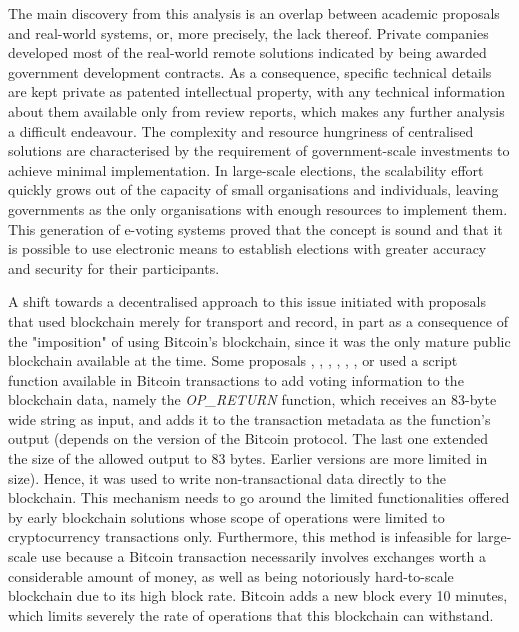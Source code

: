 \documentclass[../main.tex]{subfiles}
\begin{document}
    The main discovery from this analysis is an overlap between academic proposals and real-world systems, or, more precisely, the lack thereof. Private companies developed most of the real-world remote solutions indicated by being awarded government development contracts. As a consequence, specific technical details are kept private as patented intellectual property, with any technical information about them available only from review reports, which makes any further analysis a difficult endeavour. The complexity and resource hungriness of centralised solutions are characterised by the requirement of government-scale investments to achieve minimal implementation. In large-scale elections, the scalability effort quickly grows out of the capacity of small organisations and individuals, leaving governments as the only organisations with enough resources to implement them. This generation of e-voting systems proved that the concept is sound and that it is possible to use electronic means to establish elections with greater accuracy and security for their participants.
    \par
    A shift towards a decentralised approach to this issue initiated with proposals that used blockchain merely for transport and record, in part as a consequence of the "imposition" of using Bitcoin's blockchain, since it was the only mature public blockchain available at the time. Some proposals \cite{Zhao2016}, \cite{Cruz2016}, \cite{Bistarelli2017}, \cite{Lee2017}, \cite{Shaheen2017}, \cite{Wu2017}, \cite{Dimitriou2020} or \cite{Bartolucci2018} used a script function available in Bitcoin transactions to add voting information to the blockchain data, namely the \textit{OP\_RETURN} function, which receives an 83-byte wide string as input, and adds it to the transaction metadata as the function's output (depends on the version of the Bitcoin protocol. The last one extended the size of the allowed output to 83 bytes. Earlier versions are more limited in size). Hence, it was used to write non-transactional data directly to the blockchain. This mechanism needs to go around the limited functionalities offered by early blockchain solutions whose scope of operations were limited to cryptocurrency transactions only. Furthermore, this method is infeasible for large-scale use because a Bitcoin transaction necessarily involves exchanges worth a considerable amount of money, as well as being notoriously hard-to-scale blockchain due to its high block rate. Bitcoin adds a new block every 10 minutes, which limits severely the rate of operations that this blockchain can withstand.
\end{document}
